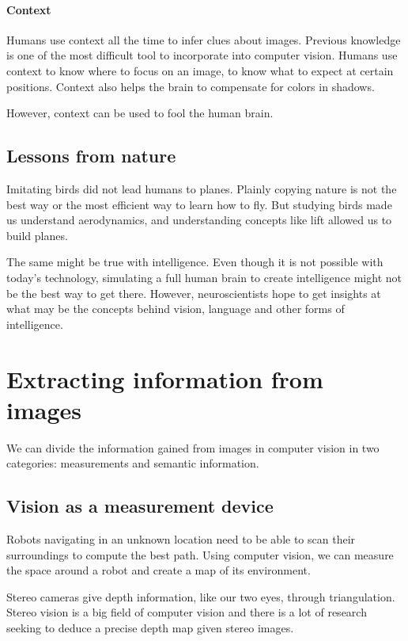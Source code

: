 \documentclass{article}
\begin{document}
\paragraph{Context}
Humans use context all the time to infer clues about images. Previous knowledge is one of the most difficult tool to incorporate into computer vision. Humans use context to know where to focus on an image, to know what to expect at certain positions. Context also helps the brain to compensate for colors in shadows.

However, context can be used to fool the human brain.

\subsection{Lessons from nature}
Imitating birds did not lead humans to planes. Plainly copying nature is not the best way or the most efficient way to learn how to fly. But studying birds made us understand aerodynamics, and understanding concepts like lift allowed us to build planes.

The same might be true with intelligence. Even though it is not possible with today's technology, simulating a full human brain to create intelligence might not be the best way to get there. However, neuroscientists hope to get insights at what may be the concepts behind vision, language and other forms of intelligence.

\section{Extracting information from images}

We can divide the information gained from images in computer vision in two categories: measurements and semantic information.

\subsection{Vision as a measurement device}
Robots navigating in an unknown location need to be able to scan their surroundings to compute the best path. Using computer vision, we can measure the space around a robot and create a map of its environment.

Stereo cameras give depth information, like our two eyes, through triangulation. Stereo vision is a big field of computer vision and there is a lot of research seeking to deduce a precise depth map given stereo images.
\end{document}
